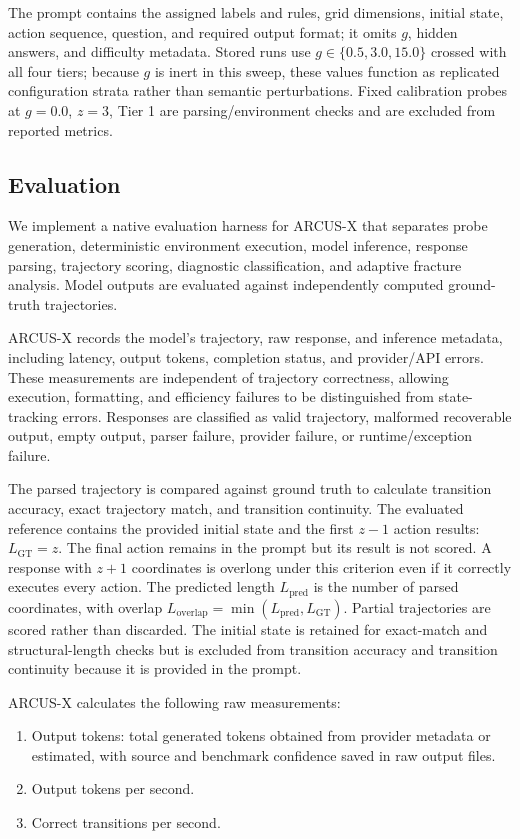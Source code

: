 \documentclass{article}
\begin{document}
The prompt contains the assigned labels and rules, grid dimensions, initial state, action sequence, question, and required output format; it omits $g$, hidden answers, and difficulty metadata. Stored runs use $g\in\{0.5,3.0,15.0\}$ crossed with all four tiers; because $g$ is inert in this sweep, these values function as replicated configuration strata rather than semantic perturbations. Fixed calibration probes at $g=0.0$, $z=3$, Tier 1 are parsing/environment checks and are excluded from reported metrics.

\subsection{Evaluation}

We implement a native evaluation harness for ARCUS-X that separates probe generation, deterministic environment execution, model inference, response parsing, trajectory scoring, diagnostic classification, and adaptive fracture analysis. Model outputs are evaluated against independently computed ground-truth trajectories.

ARCUS-X records the model's trajectory, raw response, and inference metadata, including latency, output tokens, completion status, and provider/API errors. These measurements are independent of trajectory correctness, allowing execution, formatting, and efficiency failures to be distinguished from state-tracking errors. Responses are classified as valid trajectory, malformed recoverable output, empty output, parser failure, provider failure, or runtime/exception failure.

The parsed trajectory is compared against ground truth to calculate transition
accuracy, exact trajectory match, and transition continuity. The evaluated
reference contains the provided initial state and the first $z-1$ action
results: $L_{\mathrm{GT}} = z$. The final action remains in the prompt
but its result is not scored. A response with $z+1$ coordinates is
overlong under this criterion even if it correctly executes every action.
The predicted length $L_{\mathrm{pred}}$ is the number of parsed coordinates,
with overlap $L_{\mathrm{overlap}} = \min(L_{\mathrm{pred}}, L_{\mathrm{GT}})$.
Partial trajectories are scored rather than discarded. The initial state is
retained for exact-match and structural-length checks but is excluded from
transition accuracy and transition continuity because it is provided in the
prompt.

ARCUS-X calculates the following raw measurements:
\begin{enumerate}
    \item Output tokens: total generated tokens obtained from provider metadata or estimated, with source and benchmark confidence saved in raw output files.
    \item Output tokens per second.
    \item Correct transitions per second.
\end{enumerate}
\end{document}
